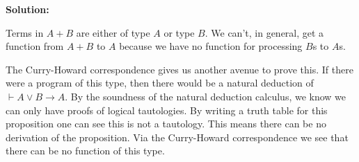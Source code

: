 \documentclass[11pt]{report}
\begin{document}
\begin{enumerate}
	{\bf Solution:}
	
	Terms in $A + B$ are either of type $A$ or type $B$. We can't, in general, get a function from $A + B$ to $A$ because we have no function for processing $B$s to $A$s. 
	
	The Curry-Howard correspondence gives us another avenue to prove this. If there were a program of this type, then there would be a natural deduction of $\vdash A \lor B \to A$. By the soundness of the natural deduction calculus, we know we can only have proofs of logical tautologies. By writing a truth table for this proposition one can see this is not a tautology. This means there can be no derivation of the proposition. Via the Curry-Howard correspondence we see that there can be no function of this type.

	 
\end{enumerate}
	
\end{document}
